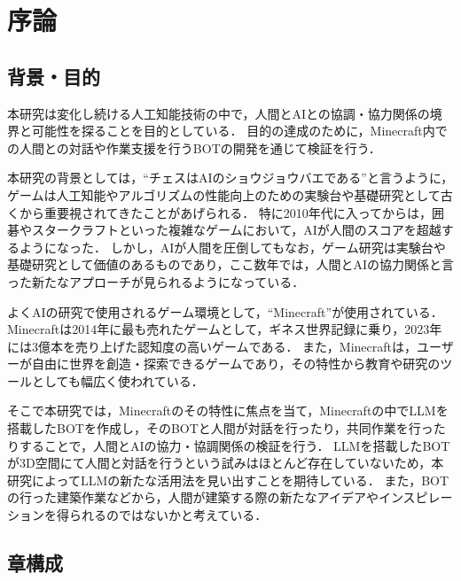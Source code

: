 \chapter{序論}	%
\thispagestyle{plain}   %


\section{背景・目的}
本研究は変化し続ける人工知能技術の中で，人間とAIとの協調・協力関係の境界と可能性を探ることを目的としている．
目的の達成のために，Minecraft内での人間との対話や作業支援を行うBOTの開発を通じて検証を行う．

本研究の背景としては，``チェスはAIのショウジョウバエである''\cite{bib:chess}と言うように，ゲームは人工知能やアルゴリズムの性能向上のための実験台や基礎研究として古くから重要視されてきたことがあげられる．
特に2010年代に入ってからは，囲碁やスタークラフトといった複雑なゲームにおいて，AIが人間のスコアを超越するようになった\cite{bib:AplpaGo,bibAlphaStar}．
しかし，AIが人間を圧倒してもなお，ゲーム研究は実験台や基礎研究として価値のあるものであり，ここ数年では，人間とAIの協力関係と言った新たなアプローチが見られるようになっている\cite{bib:maia,bib:CraftAssist}．

よくAIの研究で使用されるゲーム環境として，``Minecraft''\cite{bib:Minecraft}が使用されている．
Minecraftは2014年に最も売れたゲームとして，ギネス世界記録に乗り，2023年には3億本を売り上げた認知度の高いゲームである\cite{bib:minecraft_news}．
また，Minecraftは，ユーザーが自由に世界を創造・探索できるゲームであり，その特性から教育や研究のツールとしても幅広く使われている．

そこで本研究では，Minecraftのその特性に焦点を当て，Minecraftの中でLLMを搭載したBOTを作成し，そのBOTと人間が対話を行ったり，共同作業を行ったりすることで，人間とAIの協力・協調関係の検証を行う．
LLMを搭載したBOTが3D空間にて人間と対話を行うという試みはほとんど存在していないため，本研究によってLLMの新たな活用法を見い出すことを期待している．
また，BOTの行った建築作業などから，人間が建築する際の新たなアイデアやインスピレーションを得られるのではないかと考えている．

\section{章構成}